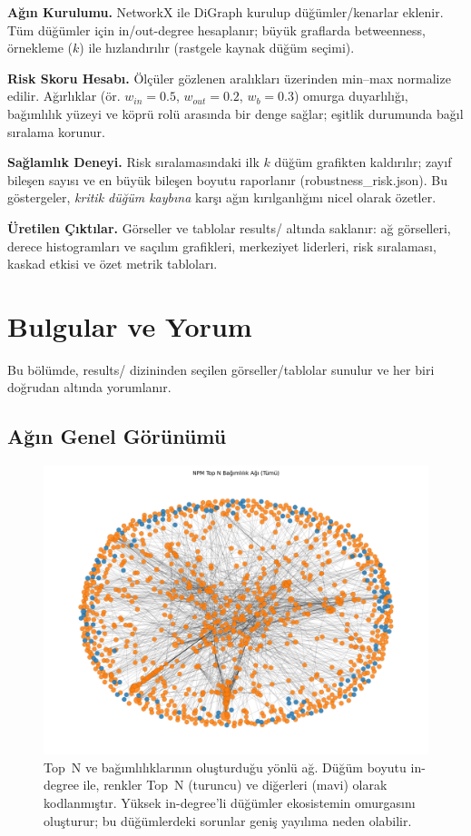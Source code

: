 \documentclass[11pt,a4paper]{article}
\begin{document}
\textbf{Ağın Kurulumu.} NetworkX ile DiGraph kurulup düğümler/kenarlar eklenir. Tüm düğümler için in/out-degree hesaplanır; büyük graflarda betweenness, örnekleme ($k$) ile hızlandırılır (rastgele kaynak düğüm seçimi).

\textbf{Risk Skoru Hesabı.} Ölçüler gözlenen aralıkları üzerinden min--max normalize edilir. Ağırlıklar (ör. $w_{in}=0.5$, $w_{out}=0.2$, $w_b=0.3$) omurga duyarlılığı, bağımlılık yüzeyi ve köprü rolü arasında bir denge sağlar; eşitlik durumunda bağıl sıralama korunur.

\textbf{Sağlamlık Deneyi.} Risk sıralamasındaki ilk $k$ düğüm grafikten kaldırılır; zayıf bileşen sayısı ve en büyük bileşen boyutu raporlanır (robustness\_risk.json). Bu göstergeler, \emph{kritik düğüm kaybına} karşı ağın kırılganlığını nicel olarak özetler.

\textbf{Üretilen Çıktılar.} Görseller ve tablolar results/ altında saklanır: ağ görselleri, derece histogramları ve saçılım grafikleri, merkeziyet liderleri, risk sıralaması, kaskad etkisi ve özet metrik tabloları.

\section{Bulgular ve Yorum}
Bu bölümde, results/ dizininden seçilen görseller/tablolar sunulur ve her biri doğrudan altında yorumlanır.

\subsection{Ağın Genel Görünümü}
\begin{figure}[H]
  \centering
  \includegraphics{network_full_topN.png}
  \caption{Top~N ve bağımlılıklarının oluşturduğu yönlü ağ. Düğüm boyutu in-degree ile, renkler Top~N (turuncu) ve diğerleri (mavi) olarak kodlanmıştır. Yüksek in-degree’li düğümler ekosistemin omurgasını oluşturur; bu düğümlerdeki sorunlar geniş yayılıma neden olabilir.}
\end{figure}
\end{document}
